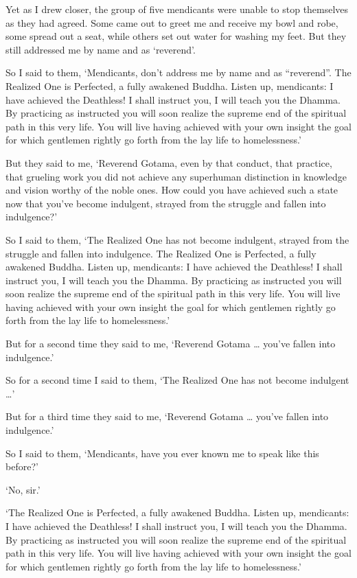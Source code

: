 \documentclass[12pt,openany]{book}%
\begin{document}
Yet as I drew closer, the group of five mendicants were unable to stop themselves as they had agreed. Some came out to greet me and receive my bowl and robe, some spread out a seat, while others set out water for washing my feet. But they still addressed me by name and as ‘reverend’. 

So I said to them, ‘Mendicants, don’t address me by name and as “reverend”. The Realized One is Perfected, a fully awakened Buddha. Listen up, mendicants: I have achieved the Deathless! I shall instruct you, I will teach you the Dhamma. By practicing as instructed you will soon realize the supreme end of the spiritual path in this very life. You will live having achieved with your own insight the goal for which gentlemen rightly go forth from the lay life to homelessness.’ 

But they said to me, ‘Reverend Gotama, even by that conduct, that practice, that grueling work you did not achieve any superhuman distinction in knowledge and vision worthy of the noble ones. How could you have achieved such a state now that you’ve become indulgent, strayed from the struggle and fallen into indulgence?’ 

So I said to them, ‘The Realized One has not become indulgent, strayed from the struggle and fallen into indulgence. The Realized One is Perfected, a fully awakened Buddha. Listen up, mendicants: I have achieved the Deathless! I shall instruct you, I will teach you the Dhamma. By practicing as instructed you will soon realize the supreme end of the spiritual path in this very life. You will live having achieved with your own insight the goal for which gentlemen rightly go forth from the lay life to homelessness.’ 

But for a second time they said to me, ‘Reverend Gotama … you’ve fallen into indulgence.’ 

So for a second time I said to them, ‘The Realized One has not become indulgent …’ 

But for a third time they said to me, ‘Reverend Gotama … you’ve fallen into indulgence.’ 

So I said to them, ‘Mendicants, have you ever known me to speak like this before?’ 

‘No, sir.’ 

‘The Realized One is Perfected, a fully awakened Buddha. Listen up, mendicants: I have achieved the Deathless! I shall instruct you, I will teach you the Dhamma. By practicing as instructed you will soon realize the supreme end of the spiritual path in this very life. You will live having achieved with your own insight the goal for which gentlemen rightly go forth from the lay life to homelessness.’ 
\end{document}
